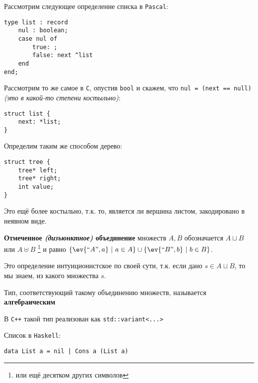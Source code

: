 Рассмотрим следующее определение списка в \texttt{Pascal}:

\begin{verbatim}
type list : record
    nul : boolean;
    case nul of
        true: ;
        false: next ^list
    end
end;
\end{verbatim}

Рассмотрим то же самое в \texttt{C}, опустив \texttt{bool} и скажем, что \texttt{nul = (next == null)} \textit{(это в какой-то степени костыльно)}:

\begin{verbatim}
struct list {
    next: *list;
}
\end{verbatim}

Определим таким же способом дерево:

\begin{verbatim}
struct tree {
    tree* left;
    tree* right;
    int value;
}
\end{verbatim}

Это ещё более костыльно, т.к. то, является ли вершина листом, закодировано в неявном виде.

\begin{definition}
    \textbf{Отмеченное \textit{(дизъюнктное)} объединение} множеств \(A, B\) обозначается \(A\sqcup B\) или \(A \uplus B\) \footnote{или ещё десятком других символов} и равно \(\{\ev{\text{``}A\text{''}, a}\ |\ a\in A\} \cup \{\ev{\text{``}B\text{''}, b}\ |\ b\in B\}\).
\end{definition}

\begin{remark}
    Это определение интуиционистское по своей сути, т.к. если дано \(s\in A \sqcup B\), то мы знаем, из какого множества \(s\).
\end{remark}

\begin{definition}
    Тип, соответствующий такому объединению множеств, называется \textbf{алгебраическим}
\end{definition}

\begin{example}
    В \texttt{C++} такой тип реализован как \texttt{std::variant<...>}
\end{example}

\begin{example}
    Список в \texttt{Haskell}:

    \begin{verbatim}
data List a = nil | Cons a (List a)
    \end{verbatim}
\end{example}

